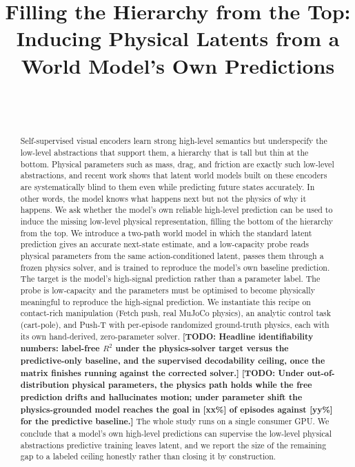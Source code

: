 \documentclass{article}
\title{Filling the Hierarchy from the Top:\\
Inducing Physical Latents from a World Model's Own Predictions}
\author{%
  \TODO{author list} \\
  \TODO{affiliation} \\
  \texttt{\TODO{email}}
}
\newcommand{\TODO}[1]{{\color{red}\textbf{[TODO: #1]}}}
\begin{document}
\maketitle

\begin{abstract}
Self-supervised visual encoders learn strong high-level semantics but
underspecify the low-level abstractions that support them, a hierarchy
that is tall but thin at the bottom. Physical parameters such as mass,
drag, and friction are exactly such low-level abstractions, and recent
work shows that latent world models built on these encoders are
systematically blind to them even while predicting future states
accurately. In other words, the model knows what happens next but not
the physics of why it happens. We ask whether the model's own reliable
high-level prediction can be used to induce the missing low-level
physical representation, filling the bottom of the hierarchy from the
top. We introduce a two-path world model in which the standard latent
prediction gives an accurate next-state estimate, and a low-capacity
probe reads physical parameters from the same action-conditioned
latent, passes them through a frozen physics solver, and is trained to
reproduce the model's own baseline prediction. The target is the
model's high-signal prediction rather than a parameter label. The probe
is low-capacity and the parameters must be optimised to become
physically meaningful to reproduce the high-signal prediction. We
instantiate this recipe on contact-rich manipulation (Fetch push, real
MuJoCo physics), an analytic control task (cart-pole), and Push-T with
per-episode randomized ground-truth physics, each with its own
hand-derived, zero-parameter solver.
\TODO{Headline identifiability numbers: label-free $R^2$ under the
physics-solver target versus the predictive-only baseline, and the
supervised decodability ceiling, once the matrix finishes running
against the corrected solver.}
\TODO{Under out-of-distribution physical parameters, the physics path
holds while the free prediction drifts and hallucinates motion; under
parameter shift the physics-grounded model reaches the goal in
[xx\%] of episodes against [yy\%] for the predictive baseline.} The
whole study runs on a single consumer GPU. We
conclude that a model's own high-level predictions can supervise the
low-level physical abstractions predictive training leaves latent, and
we report the size of the remaining gap to a labeled ceiling honestly
rather than closing it by construction.
\end{abstract}









\end{document}
